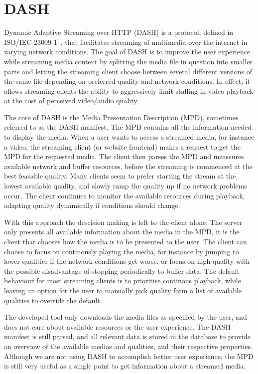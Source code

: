 \section{DASH}
Dynamic Adaptive Streaming over HTTP (DASH) is a protocol, defined in
ISO/IEC 23009-1~\cite{ISO/IEC 23009-1:2014}, that facilitates 
streaming of multimedia over the internet in varying network conditions.
The goal of DASH is to improve the user
experience while streaming media content by splitting the media file in question
into smaller parts and letting the streaming client choose between several
different versions of the same file depending on preferred quality and network
conditions. In effect, it allows streaming clients the ability to aggressively
limit stalling in video playback at the cost of perceived video/audio quality.

The core of DASH is the Media Presentation Description (MPD), sometimes
referred to as the DASH manifest. The MPD contains all the information
needed to display the media. When a user wants to access a streamed
media, for instance a video, the streaming client (or website frontend)
makes a request to get the MPD for the requested media. The client then
parses the MPD and meassures available network and buffer resources,
before the streaming is commenced at the best feasable quality. Many clients %
seem to prefer starting the stream at the lowest available quality, and
slowly ramp the quality up if no network problems occur. The
client continues to monitor the available resources during playback, adapting
quality dynamically if conditions should change.

With this approach the descision making is left to the client alone. The
server only presents all available information about the media in the
MPD, it is the client that chooses how the media is to be presented to
the user. The client can choose to focus on continously playing the
media, for instance by jumping to lower qualities if the network
conditions get worse, or focus on high quality with the possible
disadvantage of stopping periodically to buffer data. The default
behaviour for most streaming clients is to prioritise continous playback,
while leaving an option for the user to manually pick quality form a list
of available qualities to override the default.

The developed tool only downloads the media files as specified by the
user, and does not care about available resources or the user experience.
The DASH manifest is still parsed, and all relevant data is stored in the
database to provide an overview of the available medias and qualities,
and their respective properties. Although we are not using DASH to
accomplish better user experience, the MPD is still very useful as a
single point to get information about a streamed media.

